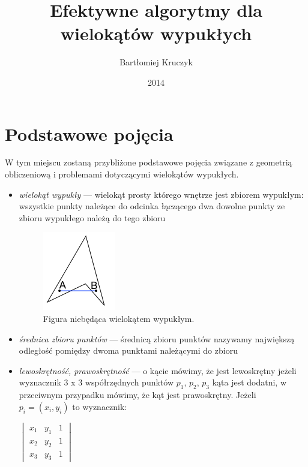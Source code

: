 \documentclass[oneside,brudnopis]{xelatex-mgr/xmgr}
\author   {Bartłomiej Kruczyk}
\title    {Efektywne algorytmy dla wielokątów wypukłych}
\date     {2014}
\begin{document}
\begin{abstract}
\blindtext[1]
\end{abstract}

\keywords{}

\maketitle


\chapter{Podstawowe pojęcia}
W tym miejscu zostaną przybliżone podstawowe pojęcia związane z
geometrią obliczeniową i problemami dotyczącymi wielokątów wypukłych.

\begin{itemize}
\item{\emph{wielokąt wypukły}} --- wielokąt prosty którego wnętrze
  jest zbiorem wypukłym: wszystkie punkty należące do odcinka
  łączącego dwa dowolne punkty ze zbioru wypukłego należą do tego
  zbioru

  \begin{figure}[htp]
    \centering
    \includegraphics{img/nonconvex}
    \caption{Figura niebędąca wielokątem wypukłym.}
  \end{figure}

\item{\emph{średnica zbioru punktów}} --- średnicą zbioru punktów
  nazywamy największą odległość pomiędzy dwoma punktami należącymi do
  zbioru

\item{\emph{lewoskrętność, prawoskrętność}} --- o kącie mówimy, że
  jest lewoskrętny jeżeli wyznacznik 3 x 3 współrzędnych punktów
  $p_1$, $p_2$, $p_3$ kąta jest dodatni, w przeciwnym przypadku
  mówimy, że kąt jest prawoskrętny. Jeżeli $p_i = (x_i, y_i)$ to
  wyznacznik:

  \begin{center}
    \begin{math}
      \begin{vmatrix}
        x_1 & y_1 & 1 \\
        x_2 & y_2 & 1 \\
        x_3 & y_3 & 1
      \end{vmatrix}
    \end{math}
  \end{center}


\end{itemize}
\end{document}
